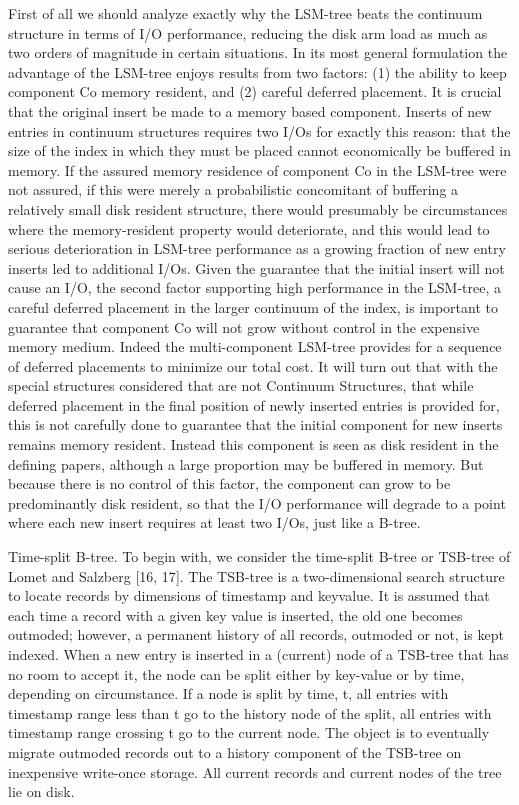 \documentclass[a4paper,11pt,notitlepage,twoside,openright]{article}
\begin{document}
First of all we should analyze exactly why the LSM-tree beats the
continuum structure in terms of I/O performance, reducing the disk arm
load as much as two orders of magnitude in certain situations. In its
most general formulation the advantage of the LSM-tree enjoys results
from two factors: (1) the ability to keep component Co memory resident,
and (2) careful deferred placement. It is crucial that the original
insert be made to a memory based component. Inserts of new entries in
continuum structures requires two I/Os for exactly this reason: that the
size of the index in which they must be placed cannot economically be
buffered in memory. If the assured memory residence of component Co in
the LSM-tree were not assured, if this were merely a probabilistic
concomitant of buffering a relatively small disk resident structure,
there would presumably be circumstances where the memory-resident
property would deteriorate, and this would lead to serious deterioration
in LSM-tree performance as a growing fraction of new entry inserts led
to additional I/Os. Given the guarantee that the initial insert will not
cause an I/O, the second factor supporting high performance in the
LSM-tree, a careful deferred placement in the larger continuum of the
index, is important to guarantee that component Co will not grow without
control in the expensive memory medium. Indeed the multi-component
LSM-tree provides for a sequence of deferred placements to minimize our
total cost. It will turn out that with the special structures considered
that are not Continuum Structures, that while deferred placement in the
final position of newly inserted entries is provided for, this is not
carefully done to guarantee that the initial component for new inserts
remains memory resident. Instead this component is seen as disk resident
in the defining papers, although a large proportion may be buffered in
memory. But because there is no control of this factor, the component
can grow to be predominantly disk resident, so that the I/O performance
will degrade to a point where each new insert requires at least two
I/Os, just like a B-tree.

Time-split B-tree. To begin with, we consider the time-split B-tree or
TSB-tree of Lomet and Salzberg {[}16, 17{]}. The TSB-tree is a
two-dimensional search structure to locate records by dimensions of
timestamp and keyvalue. It is assumed that each time a record with a
given key value is inserted, the old one becomes outmoded; however, a
permanent history of all records, outmoded or not, is kept indexed. When
a new entry is inserted in a (current) node of a TSB-tree that has no
room to accept it, the node can be split either by key-value or by time,
depending on circumstance. If a node is split by time, t, all entries
with timestamp range less than t go to the history node of the split,
all entries with timestamp range crossing t go to the current node. The
object is to eventually migrate outmoded records out to a history
component of the TSB-tree on inexpensive write-once storage. All current
records and current nodes of the tree lie on disk.
\end{document}
